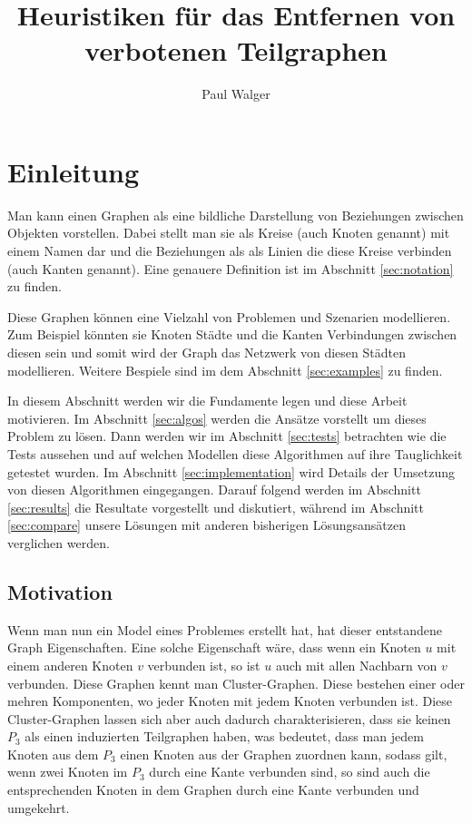 \documentclass[12pt,a4paper,onecolumn,oneside,titlepage]{article}
\author{Paul Walger}
\title{Heuristiken für das Entfernen von verbotenen Teilgraphen}
\begin{document}
\maketitle
\tableofcontents
\newpage

\section{Einleitung}
Man kann einen Graphen als eine bildliche Darstellung von Beziehungen zwischen Objekten vorstellen. Dabei stellt man sie als Kreise (auch Knoten genannt) mit einem Namen dar und die Beziehungen als als Linien die diese Kreise verbinden (auch Kanten genannt). \cite{Nastos06}  Eine genauere Definition ist im Abschnitt \ref{sec:notation} zu finden.

Diese Graphen können eine Vielzahl von Problemen und Szenarien modellieren. Zum Beispiel könnten sie Knoten Städte und die Kanten Verbindungen zwischen diesen sein und somit wird der Graph das Netzwerk von diesen Städten modellieren. Weitere Bespiele sind im dem Abschnitt \ref{sec:examples} zu finden.

In diesem Abschnitt werden wir die Fundamente legen und diese Arbeit motivieren. Im Abschnitt \ref{sec:algos} werden die Ansätze vorstellt um dieses Problem zu lösen. Dann werden wir im Abschnitt \ref{sec:tests} betrachten wie die Tests aussehen und auf welchen Modellen diese Algorithmen auf ihre Tauglichkeit getestet wurden. Im Abschnitt \ref{sec:implementation} wird Details der Umsetzung von diesen Algorithmen eingegangen. Darauf folgend werden im Abschnitt \ref{sec:results} die Resultate vorgestellt und diskutiert, während im Abschnitt \ref{sec:compare} unsere Lösungen mit anderen bisherigen Lösungsansätzen verglichen werden.

\subsection{Motivation}
Wenn man nun ein Model eines Problemes erstellt hat, hat dieser entstandene Graph Eigenschaften. Eine solche Eigenschaft wäre, dass wenn ein Knoten $u$ mit einem anderen Knoten $v$ verbunden ist, so ist $u$ auch mit allen Nachbarn von $v$ verbunden. Diese Graphen kennt man Cluster-Graphen. Diese bestehen einer oder mehren Komponenten, wo jeder Knoten mit jedem Knoten verbunden ist.
Diese Cluster-Graphen lassen sich aber auch dadurch charakterisieren, dass sie keinen $P_3$ als einen induzierten Teilgraphen haben, was bedeutet, dass man jedem Knoten aus dem $P_3$ einen Knoten aus der Graphen zuordnen kann, sodass gilt, wenn zwei Knoten im $P_3$ durch eine Kante verbunden sind, so sind auch die entsprechenden Knoten in dem Graphen durch eine Kante verbunden und umgekehrt.
 
\end{document}
